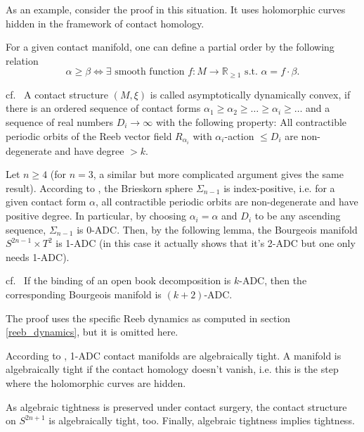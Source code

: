 As an example, consider the proof in this situation. It uses holomorphic curves hidden in the framework of contact homology.

For a given contact manifold, one can define a partial order by the following relation
\[
    \alpha \geq \beta \Leftrightarrow \exists \text{ smooth function } f: M \to \mathbb R_{\geq 1} \text{ s.t. } \alpha = f \cdot \beta.
\]
\begin{definition}[k-ADC]cf.~\cite[Definition 2.5]{BGMZ22}
    A contact structure $(M, \xi)$ is called asymptotically dynamically convex, if there is an ordered sequence of contact forms 
    $\alpha_1 \geq \alpha_2 \geq \dots \geq \alpha_i \geq \dots$ and a sequence of real numbers $D_i \to \infty$
    with the following property:
    All contractible periodic orbits of the Reeb vector field $R_{\alpha_i}$ with $\alpha_i$-action $\leq D_i$ are non-degenerate
    and have degree $> k$.
\end{definition}

Let $n \geq 4$ (for $n = 3$, a similar but more complicated argument gives the same result).
According to \cite{vK08}, the Brieskorn sphere $\Sigma_{n-1}$ is index-positive, i.e. for a given contact form $\alpha$, all contractible periodic orbits
are non-degenerate and have positive degree.
In particular, by choosing $\alpha_i = \alpha$ and $D_i$ to be any ascending sequence, $\Sigma_{n-1}$ is 0-ADC.
Then, by the following lemma, the Bourgeois manifold $S^{2n-1} \times T^2$ is 1-ADC (in this case it actually shows that it's 2-ADC but one only needs 1-ADC).

\begin{lemma} cf.~\cite[Lemma 2.8]{BGMZ22}\label{binding_adc}
    If the binding of an open book decomposition is $k$-ADC, then the corresponding Bourgeois manifold is $(k+2)$-ADC.
\end{lemma}
The proof uses the specific Reeb dynamics as computed in section \cref{reeb_dynamics}, but it is omitted here.

According to \cite[Proposition 3.2 5 (c)]{BGMZ22}, 1-ADC contact manifolds are algebraically tight.
A manifold is algebraically tight if the contact homology doesn't vanish, i.e. this is the step where the holomorphic curves are hidden.

As algebraic tightness is preserved under contact surgery, the contact structure on $S^{2n+1}$ is algebraically tight, too.
Finally, algebraic tightness implies tightness.